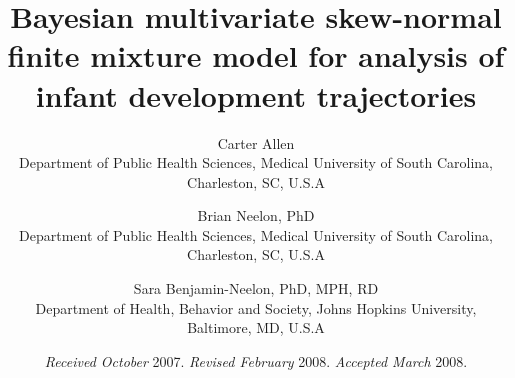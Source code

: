 \documentclass[useAMS,referee]{biom}
\title[]{Bayesian multivariate skew-normal finite mixture model for analysis of infant development trajectories}
\author
{Carter Allen\emailx{allecart@musc.edu} \\
Department of Public Health Sciences, Medical University of South Carolina, Charleston, SC, U.S.A
\and
Brian Neelon, PhD \\
Department of Public Health Sciences, Medical University of South Carolina, Charleston, SC, U.S.A
\and
Sara Benjamin-Neelon, PhD, MPH, RD \\
Department of Health, Behavior and Society, Johns Hopkins University, Baltimore, MD, U.S.A}
\begin{document}

\date{{\it Received October} 2007. {\it Revised February} 2008.  {\it
Accepted March} 2008.}



\pagerange{\pageref{firstpage}--\pageref{lastpage}} 




\label{firstpage}

\end{document}
